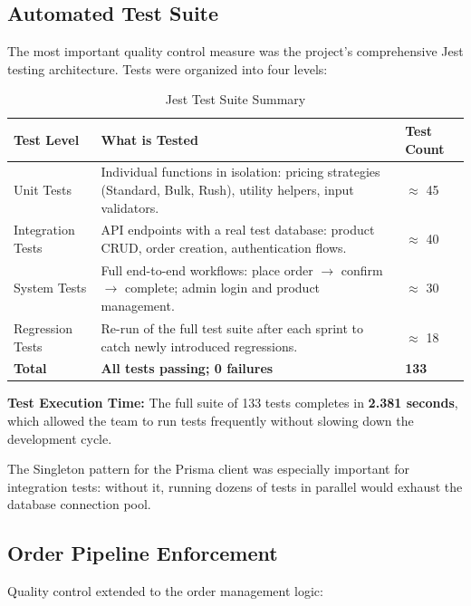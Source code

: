 \documentclass[12pt,a4paper]{report}
\begin{document}
\subsection{Automated Test Suite}

The most important quality control measure was the project's comprehensive Jest testing architecture. Tests were organized into four levels:

\begin{table}[H]
  \centering
  \caption{Jest Test Suite Summary}
  \begin{tabularx}{\textwidth}{L{3cm} X R{2cm}}
    \toprule
    \textbf{Test Level} & \textbf{What is Tested} & \textbf{Test Count} \\
    \midrule
    Unit Tests
      & Individual functions in isolation: pricing strategies (Standard, Bulk, Rush), utility helpers, input validators.
      & $\approx$ 45 \\
    Integration Tests
      & API endpoints with a real test database: product CRUD, order creation, authentication flows.
      & $\approx$ 40 \\
    System Tests
      & Full end-to-end workflows: place order $\to$ confirm $\to$ complete; admin login and product management.
      & $\approx$ 30 \\
    Regression Tests
      & Re-run of the full test suite after each sprint to catch newly introduced regressions.
      & $\approx$ 18 \\
    \midrule
    \textbf{Total} & \textbf{All tests passing; 0 failures} & \textbf{133} \\
    \bottomrule
  \end{tabularx}
\end{table}

\textbf{Test Execution Time:} The full suite of 133 tests completes in \textbf{2.381 seconds}, which allowed the team to run tests frequently without slowing down the development cycle.

The Singleton pattern for the Prisma client was especially important for integration tests: without it, running dozens of tests in parallel would exhaust the database connection pool.

\subsection{Order Pipeline Enforcement}

Quality control extended to the order management logic:
\end{document}
